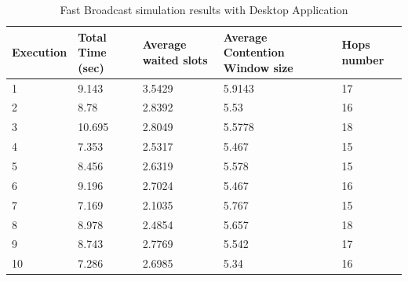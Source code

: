 \begin{table}
\caption{Fast Broadcast simulation results with Desktop Application}
\label{tab:Desktop_res}
\centering
\begin{tabular}{|m{}|m{}|m{}|m{}|m{}|}
\hline
Execution & Total \newline Time (sec) & Average waited slots & Average Contention Window size & Hops \newline number \\
\hline
1 & 9.143	& 3.5429	& 5.9143 	& 17 \\
\hline
2 & 8.78	& 2.8392  	& 5.53 		& 16 \\
\hline
3 & 10.695 	& 2.8049	& 5.5778 	& 18 \\
\hline
4 & 7.353 	& 2.5317  	& 5.467 	& 15 \\ 
\hline
5 & 8.456	& 2.6319 	& 5.578		& 15 \\
\hline
6 & 9.196	& 2.7024 	& 5.467		& 16 \\ 
\hline
7 & 7.169	& 2.1035	& 5.767		& 15 \\
\hline
8 & 8.978	& 2.4854	& 5.657		& 18 \\
\hline
9 & 8.743	& 2.7769	& 5.542		& 17 \\
\hline
10 & 7.286	& 2.6985 	& 5.34 		& 16 \\
\hline
\end{tabular}
\end{table}  
